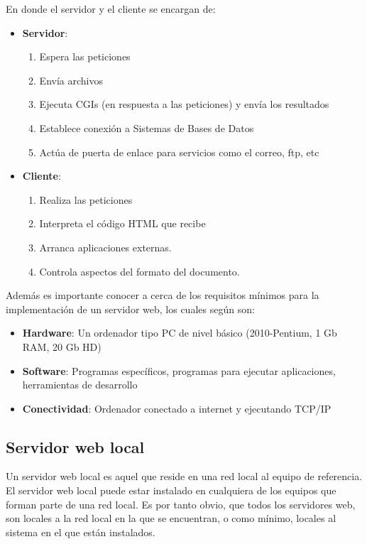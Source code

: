 En donde el servidor y el cliente se encargan de:

\begin{itemize}
\item \textbf{Servidor}:
  \begin{enumerate}
  \item Espera las peticiones
  \item Envía archivos
  \item Ejecuta CGIs (en respuesta a las peticiones) y envía los resultados
  \item Establece conexión a Sistemas de Bases de Datos
  \item Actúa de puerta de enlace para servicios como el correo, ftp, etc
  \end{enumerate}
\item \textbf{Cliente}:
	\begin{enumerate}
    \item Realiza las peticiones
    \item Interpreta el código HTML que recibe
    \item Arranca aplicaciones externas.
    \item Controla aspectos del formato del documento.
	\end{enumerate}
\end{itemize}

Además es importante conocer a cerca de los requisitos mínimos para la implementación de un servidor web, los cuales según \cite{Sanchez2018} son:
\begin{itemize}
\item \textbf{Hardware}: Un ordenador tipo PC de nivel básico (2010-Pentium, 1 Gb RAM, 20 Gb HD)
\item \textbf{Software}: Programas específicos, programas para ejecutar aplicaciones, herramientas de desarrollo
\item \textbf{Conectividad}: Ordenador conectado a internet y ejecutando TCP/IP
\end{itemize}
\subsection{Servidor web local}

Un servidor web local es aquel que reside en una red local al equipo de referencia. El servidor web local puede estar instalado en cualquiera de los equipos que forman parte de una red local. Es por tanto obvio, que todos los servidores web, son locales a la red local en la que se encuentran, o como mínimo, locales al sistema en el que están instalados. 

